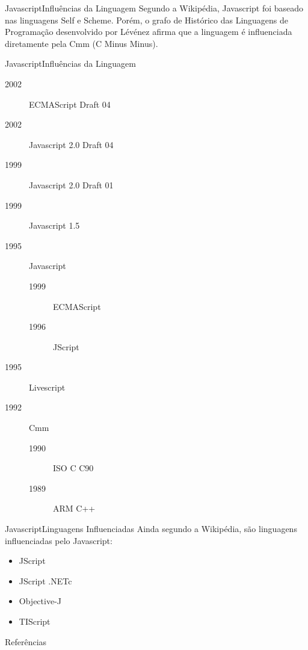 \documentclass[hyperref={pdfpagelabels=false}]{beamer}
\begin{document}
\begin{frame}{Javascript}{Influências da Linguagem}
    Segundo a Wikipédia\cite{wikipedia}, Javascript foi baseado nas linguagens
    Self e Scheme. Porém, o grafo de Histórico das Linguagens de Programação
    desenvolvido por Lévénez\cite{plotter} afirma que a linguagem é influenciada
    diretamente pela Cmm (C Minus Minus\cite{cmm}).
\end{frame}

\begin{frame}{Javascript}{Influências da Linguagem}
    \begin{description}
    \item[2002] ECMAScript Draft 04
    \item[2002] Javascript 2.0 Draft 04
    \item[1999] Javascript 2.0 Draft 01
    \item[1999] Javascript 1.5
    \item[1995] Javascript
        \begin{description}
        \item[1999] ECMAScript
        \item[1996] JScript
        \end{description}
    \item[1995] Livescript
    \item[1992] Cmm
        \begin{description}
        \item[1990] ISO C C90
        \item[1989] ARM C++
        \end{description}
    \end{description}
\end{frame}

\begin{frame}{Javascript}{Linguagens Influenciadas}
    Ainda segundo a Wikipédia\cite{wikipedia}, são linguagens influenciadas pelo
    Javascript:
    \begin{itemize}
        \item JScript
        \item JScript .NETc
        \item Objective-J
        \item TIScript
    \end{itemize}
\end{frame}

\begin{frame}[allowframebreaks]{Referências}
    
    
\end{frame}
\end{document}
